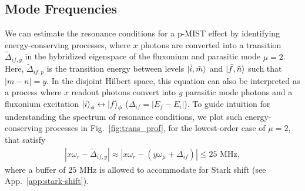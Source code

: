 \documentclass[%
reprint,
superscriptaddress,
 amsmath,amssymb,
 aps,
 prx,
longbibliography,
floatfix,
]{revtex4-2}
\begin{document}
\subsection{Mode Frequencies}\label{mode-frequencies}
 We can estimate the resonance conditions for a p-MIST effect by identifying  energy-conserving processes, where $x$ photons are converted into a transition $\tilde{\Delta}_{if,y}$ in the hybridized eigenspace of the fluxonium and parasitic mode $\mu=2$. Here, $\tilde{\Delta}_{if,p}$ is the transition energy between levels $\ket{\tilde{i},\tilde{m}}$ and $\ket{\tilde{f},\tilde{n}}$ such that $|m-n|=y$. In the disjoint Hilbert space, this equation can also be interpreted as a process where $x$ readout photons convert into $y$ parasitic mode photons and a fluxonium excitation $\ket{i}_\phi \leftrightarrow \ket{f}_\phi$ ($\Delta_{if}=|E_f-E_i|$). To guide intuition for understanding the spectrum of resonance conditions, we plot such energy-conserving processes in Fig.~\ref{fig:trans_prof}, for the lowest-order case of $\mu=2$, that satisfy
\begin{align}
    |x\omega_r-\tilde{\Delta}_{if,y}|\approx|x\omega_r-(y\omega_\mu+\Delta_{if})|\le 25 \textrm{ MHz} ,
    \label{eq:En_cons}
\end{align}
where a buffer of $25$ MHz is allowed to accommodate for Stark shift (see App.~\ref{app:stark-shift}).
\end{document}
